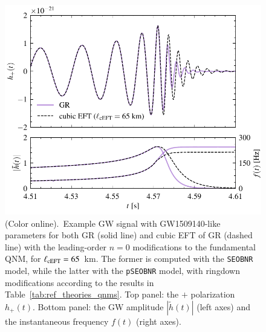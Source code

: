 \documentclass[twocolumn,
               prd,
               aps,
               superscriptaddress,
               tightenlines,
               nofootinbib,
               eqsecnum,
               amsfonts,
               amsmath,
               longbibliography]{revtex4-1}
\newcommand{\pSEOB}{\texttt{pSEOBNR}}
\newcommand{\SEOB}{\texttt{SEOBNR}}
\begin{document}
\begin{figure}[t]
\includegraphics[width=\columnwidth]{figs/example_waveform_cubicEFT.pdf}
\caption{(Color online).~Example GW signal with GW1509140-like parameters
for both GR (solid line) and cubic EFT of GR (dashed line) with the leading-order
$n=0$ modifications to the fundamental QNM, for $\ell_{\rm cEFT} = 65$~km.
%
The former is computed with the \SEOB{} model, while the latter with the
\pSEOB{} model, with ringdown modifications according to the results in
Table~\ref{tab:ref_theories_qnms}.
%
Top panel: the $+$ polarization $h_{+}(t)$. Bottom panel: the GW amplitude
$|\tilde{h}(t)|$ (left axes) and the instantaneous frequency $f(t)$ (right axes).
}
\label{fig:example_waveform}
\end{figure}
\end{document}
